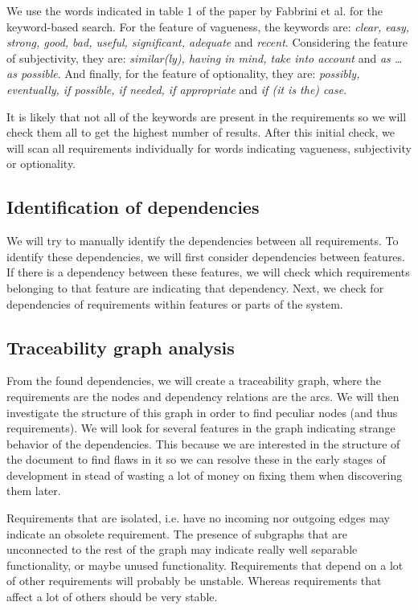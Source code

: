 \documentclass[a4paper,twoside, twocolumn,11pt]{article}
\numberwithin{equation}{section}
\begin{document}
We use the words indicated in table 1 of the paper by Fabbrini et al. \cite{paper} for the keyword-based search. For the feature of vagueness, the keywords are: \textit{clear, easy, strong, good, bad, useful, significant, adequate} and \textit{recent}. Considering the feature of subjectivity, they are: \textit{similar(ly), having in mind, take into account} and \textit{ as \ldots as possible}. And finally, for the feature of optionality, they are: \textit{possibly, eventually, if possible, if needed, if appropriate} and \textit{if (it is the) case}.

It is likely that not all of the keywords are present in the requirements so we will check them all to get the highest number of results. After this initial check, we will scan all requirements individually for words indicating vagueness, subjectivity or optionality.

\subsection{Identification of dependencies}
We will try to manually identify the dependencies between all requirements. To identify these dependencies, we will first consider dependencies between features.  If there is a dependency between these features, we will check which requirements belonging to that feature are indicating that dependency. Next, we check for dependencies of requirements within features or parts of the system.%

\subsection{Traceability graph analysis}\label{2.3}
From the found dependencies, we will create a traceability graph, where the requirements are the nodes and dependency relations are the arcs. We will then investigate the structure of this graph in order to find peculiar nodes (and thus requirements). We will look for several features in the graph indicating strange behavior of the dependencies. This because we are interested in the structure of the document to find flaws in it so we can resolve these in the early stages of development in stead of wasting a lot of money on fixing them when discovering them later. 

Requirements that are isolated, i.e. have no incoming nor outgoing edges may indicate an obsolete requirement. The presence of subgraphs that are unconnected to the rest of the graph may indicate really well separable functionality, or maybe unused functionality. Requirements that depend on a lot of other requirements will probably be unstable. Whereas requirements that affect a lot of others should be very stable. 
\end{document}
